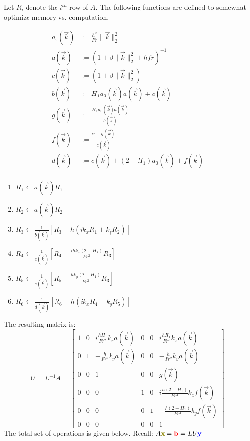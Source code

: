 \documentclass[10pt]{article}
\newcommand{\mbfb}[1]{{\color{blue}\mathbf{#1}}}
\newcommand{\mbfr}[1]{{\color{red}\mathbf{#1}}}
\newcommand{\mbfg}[1]{{\color{olive}\mathbf{#1}}}
\begin{document}
Let $R_i$ denote the $i^{th}$ row of $A$. 
The following functions are defined to somewhat optimize memory vs. computation.

\begin{align*}
a_0(\vec{k}) &:=\frac{h^2}{Fr}\|\vec{k}\|_2^2\\
a(\vec{k}) &:= (1+\beta\|\vec{k}\|_2^2+h fr)^{-1}\\
c(\vec{k}) &:= (1+\beta\|\vec{k}\|_2^2) \\
b(\vec{k}) &:= H_1 a_0(\vec{k})a(\vec{k})+c(\vec{k})\\
g(\vec{k}) &:= \frac{H_1a_0(\vec{k})a(\vec{k})}{b(\vec{k})} \\
f(\vec{k}) &:= \frac{\alpha-g(\vec{k})}{c(\vec{k})}\\
d(\vec{k}) &:= c(\vec{k}) + (2-H_1)a_0(\vec{k})+f(\vec{k})\\
\end{align*}
\begin{enumerate}
	\item $R_1 \gets a(\vec{k}) R_1$
	\item $R_2 \gets a(\vec{k}) R_2$
	\item $R_3 \gets \frac{1}{b(\vec{k})}[R_3-h\left(ik_xR_1 +k_yR_2\right)]$
	\item $R_4 \gets \frac{1}{c(\vec{k})}[R_4-\frac{ihk_x(2-H_1)}{Fr^2}R_3]$
	\item $R_5 \gets \frac{1}{c(\vec{k})}[R_5+\frac{hk_y(2-H_1)}{Fr^2}R_3]$
	\item $R_6 \gets \frac{1}{d(\vec{k})}[R_6-h\left(ik_xR_4 +k_yR_5\right)]$
\end{enumerate}
The resulting matrix is: \[U = L^{-1}A = 
\begin{bmatrix}
1 & 0 & i \frac{h H_1}{Fr^2}k_xa(\vec{k}) & 0 & 0 & i\frac{h H_1}{Fr^2}k_xa(\vec{k}) \\
0 & 1 & -\frac{h}{Fr^2}k_ya(\vec{k}) & 0 & 0 & -\frac{h}{Fr^2}k_ya(\vec{k}) \\
0 & 0 & 1 & 0 & 0 & g(\vec{k}) \\ 
0 & 0 & 0 & 1 & 0 & i \frac{h(2-H_1)}{Fr^2}k_x f(\vec{k}) \\
0 & 0 & 0 & 0 & 1 & -\frac{h(2-H_1)}{Fr^2}k_y f(\vec{k}) \\
0 & 0 & 0 & 0 & 0 & 1
\end{bmatrix}\] 
The total set of operations is given below.
Recall:
$A\mbfg{x}=\mbfr{b} = LU\mbfb{y}$
\end{document}
